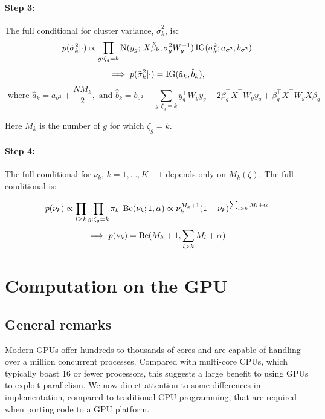 {\paragraph{Step 3:} The full conditional for cluster variance, $\tilde{\sigma}_k^2$, is:
    \begin{equation}
      p(\tilde{\sigma}_k^2|\cdot) \propto \prod_{g:\zeta_g=k}
      \operatorname{N}(y_g;\,X\tilde{\beta}_k, \sigma^2_gW^{-1}_g)
      \operatorname{IG}(\tilde{\sigma}_k^2; a_{\sigma^2},b_{\sigma^2})
    \end{equation}
    \begin{equation*}
      \implies p(\tilde{\sigma}_k^2|\cdot) = \operatorname{IG}(\hat{a}_k,\hat{b}_k), 
    \end{equation*}
    \begin{equation*}
      \mbox{ where }\hat{a}_k = a_{\sigma^2} + \frac{NM_k}{2},\mbox{ and }\hat{b}_k= b_{\sigma^2} + \sum_{g:\zeta_g=k}y_g^\top W_g y_g -2 \beta_g^\top X^\top W_g y_g  +\beta_g^\top X^\top W_g X \beta_g
    \end{equation*}

    Here $M_k$ is the number of $g$ for which $\zeta_g = k$. 
\paragraph{Step 4:} The full conditional for $\nu_k,\,k=1,\ldots,K-1$ depends only on $M_k(\zeta)$. The full conditional is:

  \begin{equation}
    p(\nu_k) \propto \prod_{l \ge k} \prod_{g:\zeta_g=k} \pi_k \; \operatorname{Be}(\nu_k; 1, \alpha) \propto \nu_k^{M_k + 1}(1-\nu_k)^{\sum_{l > k} M_l + \alpha} 
  \end{equation}
  \begin{equation*}
    \implies p(\nu_k)=\operatorname{Be}(M_k + 1, \sum_{l>k}M_l + \alpha)
  \end{equation*}

\section{Computation on the GPU}
\label{sec:parallel}
\subsection{General remarks}
Modern GPUs offer hundreds to thousands of cores and are capable of handling over a million concurrent processes. Compared with multi-core CPUs, which typically boast 16 or fewer processors, this suggests a large benefit to using GPUs to exploit parallelism. 
We now direct attention to some differences in implementation, compared to traditional CPU programming, that are required when porting code to a GPU platform.

}

